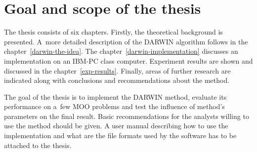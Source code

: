 \section{Goal and scope of the thesis}

The thesis consists of six chapters. Firstly, the theoretical background is
presented. A~more detailed description of the DARWIN algorithm follows in the
chapter~\ref{darwin-the-idea}. The chapter~\ref{darwin-implementation}
discusses an implementation on an IBM-PC class computer. Experiment results
are shown and discussed in the chapter~\ref{exp-results}. Finally, areas of
further research are indicated along with conclusions and recommendations
about the method.

The goal of the thesis is to implement the DARWIN method, evaluate its
performance on a~few MOO problems and test the influence of method's
parameters on the final result.  Basic recommendations for the analysts
willing to use the method should be given. A user manual describing how to use
the implementation and what are the file formats used by the software has to
be attached to the thesis.

